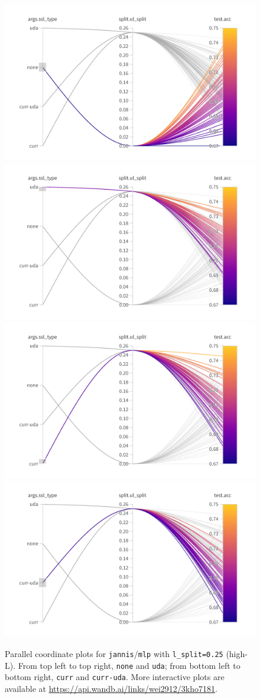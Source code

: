 \documentclass{article}
\begin{document}
\begin{figure}[htbp]
  \centering
  \includegraphics[width=0.48\columnwidth]{par_coords_jannis_mlp_icr_l_split_high_none.png}
  \includegraphics[width=0.48\columnwidth]{par_coords_jannis_mlp_icr_l_split_high_uda.png}
  \includegraphics[width=0.48\columnwidth]{par_coords_jannis_mlp_icr_l_split_high_curr.png}
  \includegraphics[width=0.48\columnwidth]{par_coords_jannis_mlp_icr_l_split_high_curr-uda.png}
  \caption{
    Parallel coordinate plots for \texttt{jannis}/\texttt{mlp} with
    \texttt{l\_split=0.25} (high-L).
    From top left to top right, \texttt{none} and \texttt{uda}; from bottom left to
    bottom right, \texttt{curr} and \texttt{curr-uda}.
    More interactive plots are available at
    {\small\url{https://api.wandb.ai/links/wei2912/3kho7181}}.
  }
  \label{fig:par_coords_jannis_mlp_icr_l_split_high}
\end{figure}
\end{document}
